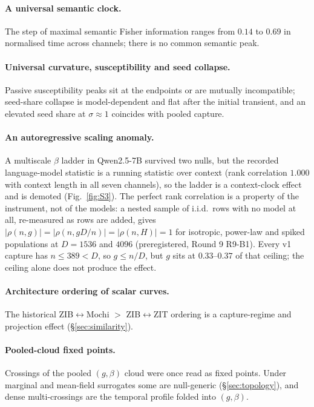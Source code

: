 \documentclass[11pt]{article}
\begin{document}
\paragraph{A universal semantic clock.} The step of maximal semantic Fisher information ranges from $0.14$ to $0.69$ in normalised time across channels; there is no common semantic peak.

\paragraph{Universal curvature, susceptibility and seed collapse.} Passive susceptibility peaks sit at the endpoints or are mutually incompatible; seed-share collapse is model-dependent and flat after the initial transient, and an elevated seed share at $\sigma\approx1$ coincides with pooled capture.

\paragraph{An autoregressive scaling anomaly.} A multiscale $\beta$ ladder in Qwen2.5-7B survived two nulls, but the recorded language-model statistic is a running statistic over context (rank correlation $1.000$ with context length in all seven channels), so the ladder is a context-clock effect and is demoted (Fig.~\ref{fig:S3}). The perfect rank correlation is a property of the instrument, not of the models: a nested sample of i.i.d.\ rows with no model at all, re-measured as rows are added, gives $|\rho(n,g)|=|\rho(n,gD/n)|=|\rho(n,H)|=1$ for isotropic, power-law and spiked populations at $D=1536$ and $4096$ (preregistered, Round 9 R9-B1). Every v1 capture has $n\le389<D$, so $g\le n/D$, but $g$ sits at $0.33$--$0.37$ of that ceiling; the ceiling alone does not produce the effect.

\paragraph{Architecture ordering of scalar curves.} The historical ZIB$\leftrightarrow$Mochi $>$ ZIB$\leftrightarrow$ZIT ordering is a capture-regime and projection effect (\S\ref{sec:similarity}).

\paragraph{Pooled-cloud fixed points.} Crossings of the pooled $(g,\beta)$ cloud were once read as fixed points. Under marginal and mean-field surrogates some are null-generic (\S\ref{sec:topology}), and dense multi-crossings are the temporal profile folded into $(g,\beta)$.
\end{document}
